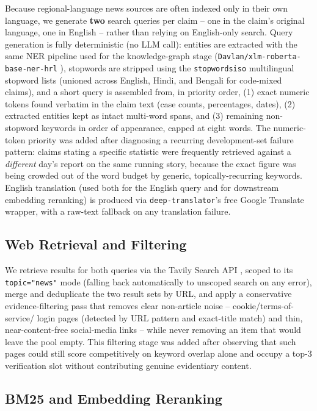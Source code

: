 \documentclass[
]{ceurart}
\begin{document}
Because regional-language news sources are often indexed only in their
own language, we generate \textbf{two} search queries per claim -- one
in the claim's original language, one in English -- rather than relying
on English-only search. Query generation is fully deterministic (no LLM
call): entities are extracted with the same NER pipeline used for the
knowledge-graph stage
(\texttt{Davlan/xlm-roberta-base-ner-hrl} \cite{davlan-xlmr-ner-hrl}),
stopwords are stripped using the \texttt{stopwordsiso} multilingual
stopword lists (unioned across English, Hindi, and Bengali for
code-mixed claims), and a short query is assembled from, in priority
order, (1) exact numeric tokens found verbatim in the claim text (case
counts, percentages, dates), (2) extracted entities kept as intact
multi-word spans, and (3) remaining non-stopword keywords in order of
appearance, capped at eight words. The numeric-token priority was added
after diagnosing a recurring development-set failure pattern: claims
stating a specific statistic were frequently retrieved against a
\emph{different} day's report on the same running story, because the
exact figure was being crowded out of the word budget by generic,
topically-recurring keywords. English translation (used both for the
English query and for downstream embedding reranking) is produced via
\texttt{deep-translator}'s free Google Translate wrapper, with a
raw-text fallback on any translation failure.

\subsection{Web Retrieval and Filtering}

We retrieve results for both queries via the Tavily Search API
\cite{tavily}, scoped to its \texttt{topic="news"} mode (falling back
automatically to unscoped search on any error), merge and deduplicate
the two result sets by URL, and apply a conservative evidence-filtering
pass that removes clear non-article noise -- cookie/terms-of-service/
login pages (detected by URL pattern and exact-title match) and thin,
near-content-free social-media links -- while never removing an item
that would leave the pool empty. This filtering stage was added after
observing that such pages could still score competitively on keyword
overlap alone and occupy a top-3 verification slot without contributing
genuine evidentiary content.

\subsection{BM25 and Embedding Reranking}
\end{document}
